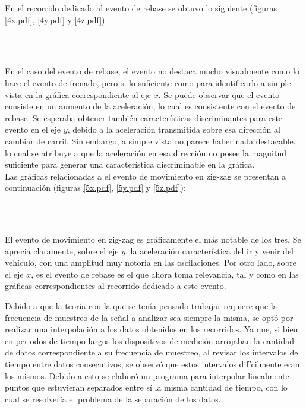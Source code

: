 En el recorrido dedicado al evento de rebase se obtuvo lo siguiente (figuras \ref{4x.pdf}, \ref{4y.pdf} y \ref{4z.pdf}):

\pagebreak
\ \\
\vspace{27cm}
\pagebreak
\ \\
\vspace{10.4cm}

En el caso del evento de rebase, el evento no destaca mucho visualmente como lo hace el evento de frenado, pero si lo suficiente como para identificarlo a simple vista en la gráfica correspondiente al eje $x$. 
Se puede observar que el evento consiste en un aumento de la aceleración, lo cual es consistente con el evento de rebase. 
Se esperaba obtener también características discriminantes para este evento en el eje $y$, debido a la aceleración transmitida sobre esa dirección al cambiar de carril. 
Sin embargo, a simple vista no parece haber nada destacable, lo cual se atribuye a que la aceleración en esa dirección no posee la magnitud suficiente para generar una característica discriminable en la gráfica.\\

Las gráficas relacionadas a el evento de movimiento en zig-zag se presentan a continuación (figuras \ref{5x.pdf}, \ref{5y.pdf} y \ref{5z.pdf}):

\pagebreak
\ \\
\vspace{27cm}
\pagebreak
\ \\
\vspace{10.4cm}

El evento de movimiento en zig-zag es gráficamente el más notable de los tres. 
Se aprecia claramente, sobre el eje $y$, la aceleración característica del ir y venir del vehículo, con una amplitud muy notoria en las oscilaciones. 
Por otro lado, sobre el eje $x$, es el evento de rebase es el que ahora toma relevancia, tal y como en las gráficas correspondientes al recorrido dedicado a este evento.

Debido a que la teoría con la que se tenía pensado trabajar requiere que la frecuencia de muestreo de la señal a analizar sea siempre la misma, se optó por realizar una interpolación a los datos obtenidos en los recorridos. 
Ya que, si bien en periodos de tiempo largos los dispositivos de medición arrojaban la cantidad de datos correspondiente a su frecuencia de muestreo, al revisar los intervalos de tiempo entre datos consecutivos, se observó que estos intervalos difícilmente eran los mismos. 
Debido a esto se elaboró un programa para interpolar linealmente puntos que estuvieran separados entre sí la misma cantidad de tiempo, con lo cual se resolvería el problema de la separación de los datos.

